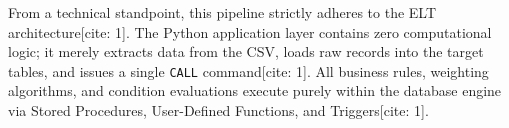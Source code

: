 From a technical standpoint, this pipeline strictly adheres to the ELT architecture[cite: 1]. The Python application layer contains zero computational logic; it merely extracts data from the CSV, loads raw records into the target tables, and issues a single \texttt{CALL} command[cite: 1]. All business rules, weighting algorithms, and condition evaluations execute purely within the database engine via Stored Procedures, User-Defined Functions, and Triggers[cite: 1].
